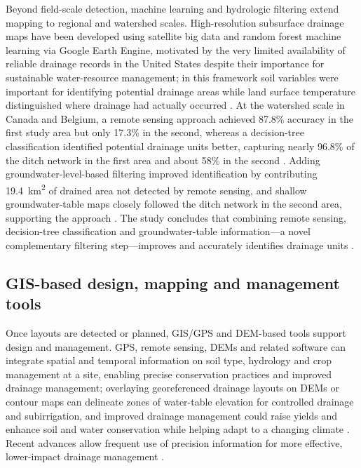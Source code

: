 Beyond field-scale detection, machine learning and hydrologic filtering extend mapping to regional and watershed scales. High-resolution subsurface drainage maps have been developed using satellite big data and random forest machine learning via Google Earth Engine, motivated by the very limited availability of reliable drainage records in the United States despite their importance for sustainable water-resource management; in this framework soil variables were important for identifying potential drainage areas while land surface temperature distinguished where drainage had actually occurred \parencite{Cho2019}. At the watershed scale in Canada and Belgium, a remote sensing approach achieved 87.8\% accuracy in the first study area but only 17.3\% in the second, whereas a decision-tree classification identified potential drainage units better, capturing nearly 96.8\% of the ditch network in the first area and about 58\% in the second \parencite{Yimer2023}. Adding groundwater-level-based filtering improved identification by contributing 19.4~km\textsuperscript{2} of drained area not detected by remote sensing, and shallow groundwater-table maps closely followed the ditch network in the second area, supporting the approach \parencite{Yimer2023}. The study concludes that combining remote sensing, decision-tree classification and groundwater-table information---a novel complementary filtering step---improves and accurately identifies drainage units \parencite{Yimer2023}.

\subsection{GIS-based design, mapping and management tools}

Once layouts are detected or planned, GIS/GPS and DEM-based tools support design and management. GPS, remote sensing, DEMs and related software can integrate spatial and temporal information on soil type, hydrology and crop management at a site, enabling precise conservation practices and improved drainage management; overlaying georeferenced drainage layouts on DEMs or contour maps can delineate zones of water-table elevation for controlled drainage and subirrigation, and improved drainage management could raise yields and enhance soil and water conservation while helping adapt to a changing climate \parencite{Shedekar2018}. Recent advances allow frequent use of precision information for more effective, lower-impact drainage management \parencite{Shedekar2018}.

